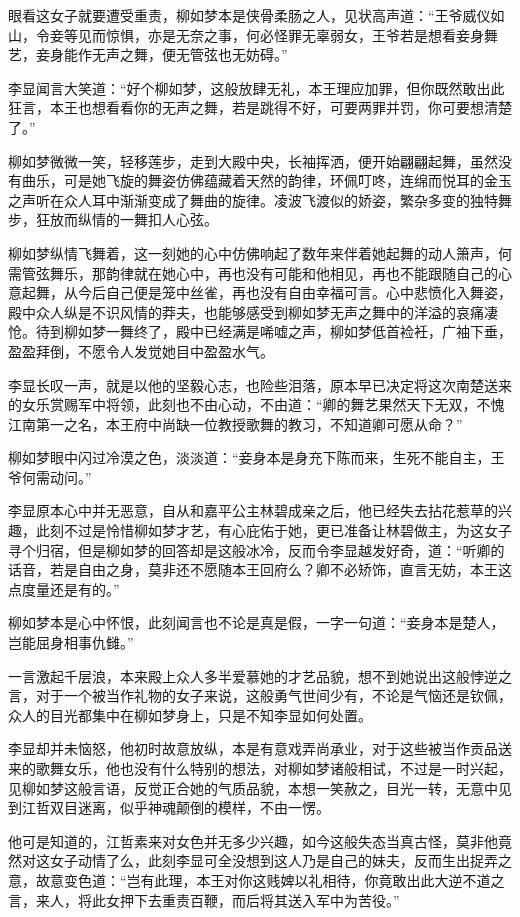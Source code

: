 眼看这女子就要遭受重责，柳如梦本是侠骨柔肠之人，见状高声道：“王爷威仪如山，令妾等见而惊惧，亦是无奈之事，何必怪罪无辜弱女，王爷若是想看妾身舞艺，妾身能作无声之舞，便无管弦也无妨碍。”

李显闻言大笑道：“好个柳如梦，这般放肆无礼，本王理应加罪，但你既然敢出此狂言，本王也想看看你的无声之舞，若是跳得不好，可要两罪并罚，你可要想清楚了。”

柳如梦微微一笑，轻移莲步，走到大殿中央，长袖挥洒，便开始翩翩起舞，虽然没有曲乐，可是她飞旋的舞姿仿佛蕴藏着天然的韵律，环佩叮咚，连绵而悦耳的金玉之声听在众人耳中渐渐变成了舞曲的旋律。凌波飞渡似的娇姿，繁杂多变的独特舞步，狂放而纵情的一舞扣人心弦。

柳如梦纵情飞舞着，这一刻她的心中仿佛响起了数年来伴着她起舞的动人箫声，何需管弦舞乐，那韵律就在她心中，再也没有可能和他相见，再也不能跟随自己的心意起舞，从今后自己便是笼中丝雀，再也没有自由幸福可言。心中悲愤化入舞姿，殿中众人纵是不识风情的莽夫，也能够感受到柳如梦无声之舞中的洋溢的哀痛凄怆。待到柳如梦一舞终了，殿中已经满是唏嘘之声，柳如梦低首裣衽，广袖下垂，盈盈拜倒，不愿令人发觉她目中盈盈水气。

李显长叹一声，就是以他的坚毅心志，也险些泪落，原本早已决定将这次南楚送来的女乐赏赐军中将领，此刻也不由心动，不由道：“卿的舞艺果然天下无双，不愧江南第一之名，本王府中尚缺一位教授歌舞的教习，不知道卿可愿从命？”

柳如梦眼中闪过冷漠之色，淡淡道：“妾身本是身充下陈而来，生死不能自主，王爷何需动问。”

李显原本心中并无恶意，自从和嘉平公主林碧成亲之后，他已经失去拈花惹草的兴趣，此刻不过是怜惜柳如梦才艺，有心庇佑于她，更已准备让林碧做主，为这女子寻个归宿，但是柳如梦的回答却是这般冰冷，反而令李显越发好奇，道：“听卿的话音，若是自由之身，莫非还不愿随本王回府么？卿不必矫饰，直言无妨，本王这点度量还是有的。”

柳如梦本是心中怀恨，此刻闻言也不论是真是假，一字一句道：“妾身本是楚人，岂能屈身相事仇雠。”

一言激起千层浪，本来殿上众人多半爱慕她的才艺品貌，想不到她说出这般悖逆之言，对于一个被当作礼物的女子来说，这般勇气世间少有，不论是气恼还是钦佩，众人的目光都集中在柳如梦身上，只是不知李显如何处置。

李显却并未恼怒，他初时故意放纵，本是有意戏弄尚承业，对于这些被当作贡品送来的歌舞女乐，他也没有什么特别的想法，对柳如梦诸般相试，不过是一时兴起，见柳如梦这般言语，反觉正合她的气质品貌，本想一笑赦之，目光一转，无意中见到江哲双目迷离，似乎神魂颠倒的模样，不由一愣。

他可是知道的，江哲素来对女色并无多少兴趣，如今这般失态当真古怪，莫非他竟然对这女子动情了么，此刻李显可全没想到这人乃是自己的妹夫，反而生出捉弄之意，故意变色道：“岂有此理，本王对你这贱婢以礼相待，你竟敢出此大逆不道之言，来人，将此女押下去重责百鞭，而后将其送入军中为苦役。”

